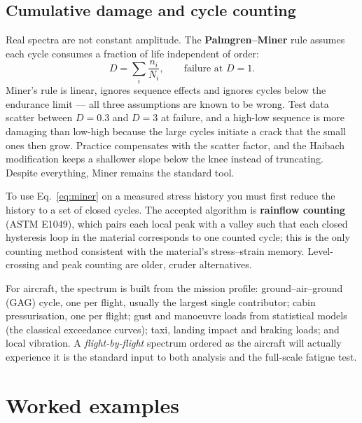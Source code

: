 \documentclass[11pt,a4paper]{article}
\begin{document}
\subsection{Cumulative damage and cycle counting}
Real spectra are not constant amplitude. The \textbf{Palmgren--Miner} rule assumes each cycle consumes a fraction of life independent of order:
\begin{equation}
  D=\sum_i \frac{n_i}{N_i}, \qquad \text{failure at } D=1.
  \label{eq:miner}
\end{equation}
Miner's rule is linear, ignores sequence effects and ignores cycles below the endurance limit --- all three assumptions are known to be wrong. Test data scatter between $D=0.3$ and $D=3$ at failure, and a high-low sequence is more damaging than low-high because the large cycles initiate a crack that the small ones then grow. Practice compensates with the scatter factor, and the Haibach modification keeps a shallower slope below the knee instead of truncating. Despite everything, Miner remains the standard tool.

To use Eq.~\eqref{eq:miner} on a measured stress history you must first reduce the history to a set of closed cycles. The accepted algorithm is \textbf{rainflow counting} (ASTM E1049), which pairs each local peak with a valley such that each closed hysteresis loop in the material corresponds to one counted cycle; this is the only counting method consistent with the material's stress--strain memory. Level-crossing and peak counting are older, cruder alternatives.

For aircraft, the spectrum is built from the mission profile: ground--air--ground (GAG) cycle, one per flight, usually the largest single contributor; cabin pressurisation, one per flight; gust and manoeuvre loads from statistical models (the classical exceedance curves); taxi, landing impact and braking loads; and local vibration. A \emph{flight-by-flight} spectrum ordered as the aircraft will actually experience it is the standard input to both analysis and the full-scale fatigue test.

\section{Worked examples}
\end{document}
